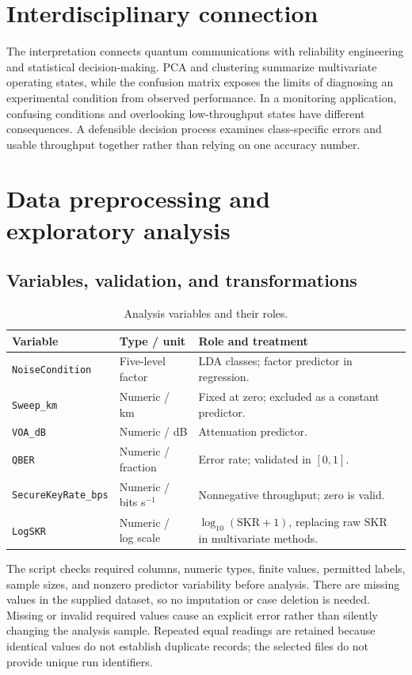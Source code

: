\documentclass[11pt]{article}
\begin{document}
\section*{Interdisciplinary connection}
The interpretation connects quantum communications with reliability engineering and statistical decision-making. PCA and clustering summarize multivariate operating states, while the confusion matrix exposes the limits of diagnosing an experimental condition from observed performance. In a monitoring application, confusing conditions and overlooking low-throughput states have different consequences. A defensible decision process examines class-specific errors and usable throughput together rather than relying on one accuracy number.

\clearpage
\section{Data preprocessing and exploratory analysis}
\subsection{Variables, validation, and transformations}
\begin{table}[!htbp]
\centering\small
\caption{Analysis variables and their roles.}
\begin{tabularx}{\linewidth}{@{}l l X@{}}
\toprule
Variable & Type / unit & Role and treatment \\
\midrule
\texttt{NoiseCondition} & Five-level factor & LDA classes; factor predictor in regression. \\
\texttt{Sweep\_km} & Numeric / km & Fixed at zero; excluded as a constant predictor. \\
\texttt{VOA\_dB} & Numeric / dB & Attenuation predictor. \\
\texttt{QBER} & Numeric / fraction & Error rate; validated in $[0,1]$. \\
\texttt{SecureKeyRate\_bps} & Numeric / bits s$^{-1}$ & Nonnegative throughput; zero is valid. \\
\texttt{LogSKR} & Numeric / log scale & $\log_{10}(\mathrm{SKR}+1)$, replacing raw SKR in multivariate methods. \\
\bottomrule
\end{tabularx}
\end{table}

The script checks required columns, numeric types, finite values, permitted labels, sample sizes, and nonzero predictor variability before analysis. There are \NMissing{} missing values in the supplied dataset, so no imputation or case deletion is needed. Missing or invalid required values cause an explicit error rather than silently changing the analysis sample. Repeated equal readings are retained because identical values do not establish duplicate records; the selected files do not provide unique run identifiers.
\end{document}
